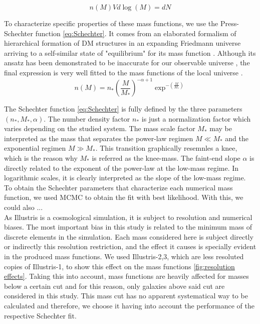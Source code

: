 \documentclass[a4paper,fleqn,usenatbib]{mnras}
\begin{document}
\begin{equation}
n(M)Vd\log{(M)} =  dN
\end{equation}

To characterize specific properties of these mass functions, we use the Press-Schechter function \ref{eq:Schechter}. 
It comes from an elaborated formalism of hierarchical formation of DM structures in an expanding Friedmann universe arriving to a self-similar state of "equilibrium" for its mass function \cite{Schechter1976}.
Although its ansatz has been demonstrated to be inaccurate for our observable universe \cite{inaccurateSchechter}, the final expression is very well fitted to the mass functions of the local universe \cite{wellfitSchechter}.\\

\begin{equation}
n\left( M \right) = n_*\left( \frac{M}{M_*} \right)^{-\alpha+1}\exp^{-\left( \frac{M}{M_*}\right)}
\label{eq:Schechter}
\end{equation}

The Schechter function \ref{eq:Schechter} is fully defined by the three parameters $(n_*,M_*,\alpha)$. 
The number density factor $n_*$ is just a normalization factor which varies depending on the studied system. 
The mass scale factor $M_*$ may be interpreted as the mass that separates the power-law regimen $M \ll M_*$ and the exponential regimen $M \gg M_*$. 
This transition graphically resemnles a knee, which is the reason why $M_*$ is referred as the knee-mass.
The faint-end slope $\alpha$ is directly related to the exponent of the power-law at the low-mass regime.
In logarithmic scales, it is clearly interpreted as the slope of the low-mass regime.\\

To obtain the Schechter parameters that characterize each numerical mass function, we used MCMC to obtain the fit with best likelihood. 
With this, we could also ...\\

As Illustris is a cosmological simulation, it is subject to resolution and numerical biases.
The most important bias in this study is related to the minimum mass of discrete elements in the simulation.
Each mass considered here is subject directly or indirectly this resolution restriction, and the effect it causes is specially evident in the produced mass functions. 
We used Illustris-2,3, which are less resoluted copies of Illustris-1, to show this effect on the mass functions \ref{fig:resolution effects}. 
Taking this into account, mass functions are heavily affected for masses below a certain cut and for this reason, only galaxies above said cut are considered in this study.
This mass cut has no apparent systematical way to be calculated and therefore, we choose it having into account the performance of the respective Schechter fit.\\
\end{document}
